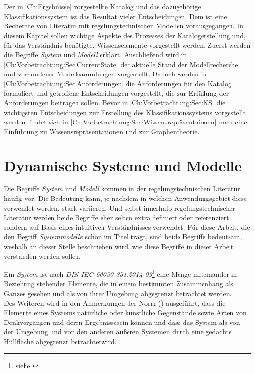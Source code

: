 Der in \autoref{Ch:Ergebnisse} vorgestellte Katalog und das dazugehörige Klassifikationssystem ist das Resultat vieler Entscheidungen. Dem ist eine Recherche von Literatur mit regelungstechnischen Modellen vorausgegangen. In diesem Kapitel sollen wichtige Aspekte des Prozesses der Katalogerstellung und, für das Verständnis benötigte, Wissenselemente vorgestellt werden. Zuerst werden die Begriffe \textit{System} und \textit{Modell} erklärt. Anschließend wird in \autoref{Ch:Vorbetrachtung:Sec:CurrentState} der aktuelle Stand der Modellrecherche und vorhandener Modellsammlungen vorgestellt. Danach werden in \autoref{Ch:Vorbetrachtung:Sec:Anforderungen} die Anforderungen für den Katalog formuliert und getroffene Entscheidungen vorgestellt, die zur Erfüllung der Anforderungen beitragen sollen. Bevor in \autoref{Ch:Vorbetrachtung:Sec:KS} die wichtigsten Entscheidungen zur Erstellung des Klassifikationssystems vorgestellt werden, findet sich in \autoref{Ch:Vorbetrachtung:Sec:Wissensrepräsentaionen} noch eine Einführung zu Wissensrepräsentationen und zur Graphentheorie.   

\section{Dynamische Systeme und Modelle}
\label{Ch:Vorbetrachtung:Sec:SystemeModelle}
Die Begriffe \textit{System} und \textit{Modell} kommen in der regelungstechnischen Literatur häufig vor. Die Bedeutung kann, je nachdem in welchen Anwendungsgebiet diese verwendet werden, stark variieren. Und selbst innerhalb regelungstechnischer Literatur werden beide Begriffe eher selten extra definiert oder referenziert, sondern auf Basis eines intuitiven Verständnisses verwendet. Für diese Arbeit, die den Begriff \textit{Systemmodelle} schon im Titel trägt, sind beide Begriffe bedeutsam, weshalb an dieser Stelle beschrieben wird, wie diese Begriffe in dieser Arbeit verstanden werden sollen.

Ein \textit{System} ist nach \textit{DIN IEC 60050-351:2014-09}\footnote{siehe \cite[S. 21]{DINIEC60050-351} } eine \glqq Menge miteinander in Beziehung stehender Elemente, die in einem bestimmten Zusammenhang als Ganzes gesehen und als von ihrer Umgebung abgegrenzt betrachtet werden\grqq.\\
Des Weiteren wird in den Anmerkungen der Norm (\cite[S. 21]{DINIEC60050-351}) ausgeführt, dass die Elemente eines Systems \glqq natürliche oder künstliche Gegenstände sowie Arten von Denkvorgängen und deren Ergebnisse\grqq sein können und dass das System \glqq als von der Umgebung und von den anderen äußeren Systemen durch eine gedachte Hüllfläche abgegrenzt betrachtet\grqq wird.

